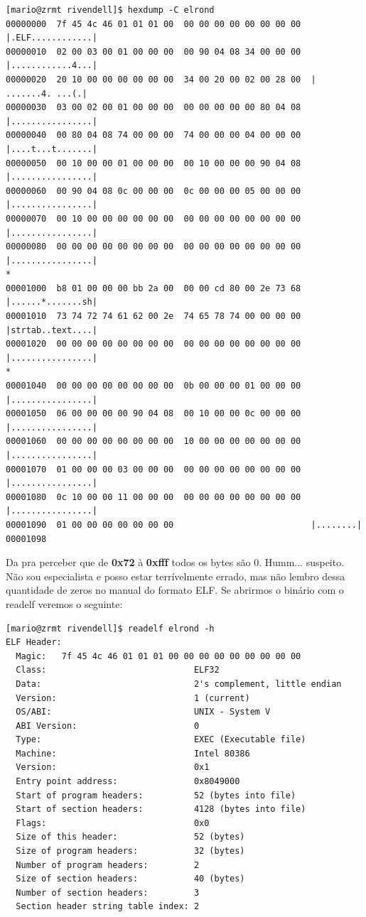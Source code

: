 \documentclass[12pt]{article}
\begin{document}
\begin{verbatim}
[mario@zrmt rivendell]$ hexdump -C elrond
00000000  7f 45 4c 46 01 01 01 00  00 00 00 00 00 00 00 00  |.ELF............|
00000010  02 00 03 00 01 00 00 00  00 90 04 08 34 00 00 00  |............4...|
00000020  20 10 00 00 00 00 00 00  34 00 20 00 02 00 28 00  | .......4. ...(.|
00000030  03 00 02 00 01 00 00 00  00 00 00 00 00 80 04 08  |................|
00000040  00 80 04 08 74 00 00 00  74 00 00 00 04 00 00 00  |....t...t.......|
00000050  00 10 00 00 01 00 00 00  00 10 00 00 00 90 04 08  |................|
00000060  00 90 04 08 0c 00 00 00  0c 00 00 00 05 00 00 00  |................|
00000070  00 10 00 00 00 00 00 00  00 00 00 00 00 00 00 00  |................|
00000080  00 00 00 00 00 00 00 00  00 00 00 00 00 00 00 00  |................|
*
00001000  b8 01 00 00 00 bb 2a 00  00 00 cd 80 00 2e 73 68  |......*.......sh|
00001010  73 74 72 74 61 62 00 2e  74 65 78 74 00 00 00 00  |strtab..text....|
00001020  00 00 00 00 00 00 00 00  00 00 00 00 00 00 00 00  |................|
*
00001040  00 00 00 00 00 00 00 00  0b 00 00 00 01 00 00 00  |................|
00001050  06 00 00 00 00 90 04 08  00 10 00 00 0c 00 00 00  |................|
00001060  00 00 00 00 00 00 00 00  10 00 00 00 00 00 00 00  |................|
00001070  01 00 00 00 03 00 00 00  00 00 00 00 00 00 00 00  |................|
00001080  0c 10 00 00 11 00 00 00  00 00 00 00 00 00 00 00  |................|
00001090  01 00 00 00 00 00 00 00                           |........|
00001098
\end{verbatim}
Da pra perceber que de \textbf{0x72} à \textbf{0xfff} todos os bytes são 0. Humm... suspeito. Não sou especialista e posso estar terrívelmente errado, mas não lembro dessa quantidade de zeros no manual do formato ELF. Se abrirmos o binário com o readelf veremos o seguinte:
\begin{verbatim}
[mario@zrmt rivendell]$ readelf elrond -h
ELF Header:
  Magic:   7f 45 4c 46 01 01 01 00 00 00 00 00 00 00 00 00
  Class:                             ELF32
  Data:                              2's complement, little endian
  Version:                           1 (current)
  OS/ABI:                            UNIX - System V
  ABI Version:                       0
  Type:                              EXEC (Executable file)
  Machine:                           Intel 80386
  Version:                           0x1
  Entry point address:               0x8049000
  Start of program headers:          52 (bytes into file)
  Start of section headers:          4128 (bytes into file)
  Flags:                             0x0
  Size of this header:               52 (bytes)
  Size of program headers:           32 (bytes)
  Number of program headers:         2
  Size of section headers:           40 (bytes)
  Number of section headers:         3
  Section header string table index: 2
\end{verbatim}
\end{document}
